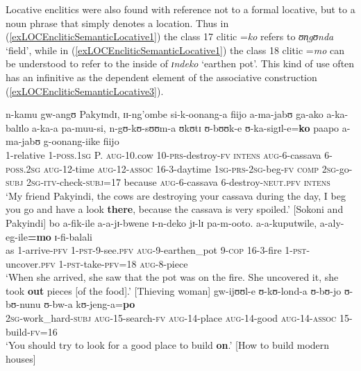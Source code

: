 Locative enclitics were also found with reference not to a formal locative, but to a noun phrase that simply denotes a location. Thus in (\ref{exLOCEncliticSemanticLocative1}) the class 17 clitic =\textit{ko} refers to \textit{ʊn̩gʊnda} \lq field', while in (\ref{exLOCEncliticSemanticLocative1}) the class 18 clitic \mbox{=\textit{mo}} can be understood to refer to the inside of \textit{ɪndeko} `earthen pot'. This kind of use often has an infinitive as the dependent element of the associative construction (\ref{exLOCEncliticSemanticLocative3}).
\begin{exe}
	\ex \label{exLOCEncliticSemanticLocative1} \gll n-kamu gw-angʊ Pakyɪndɪ, ɪɪ-ng’ombe si-k-oonang-a fiijo a-ma-jabʊ ga-ako a-ka-balɪlo a-ka-a pa-muu-si, n-gʊ-kʊ-sʊʊm-a ʊkʊtɪ ʊ-bʊʊk-e ʊ-ka-sigɪl-e=\textbf{ko} paapo a-ma-jabʊ g-oonang-iike fiijo\\
	1-relative 1-\textsc{poss.1sg} P. \textsc{aug}-10.cow 10-\textsc{prs}-destroy-\textsc{fv} \textsc{intens} \textsc{aug}-6-cassava 6-\textsc{poss.2sg} \textsc{aug}-12-time \textsc{aug}-12-\textsc{assoc} 16-3-daytime \textsc{1sg}-\textsc{prs}-\textsc{2sg}-beg-\textsc{fv} \textsc{comp} \textsc{2sg}-go-\textsc{subj} \textsc{2sg}-\textsc{itv}-check-\textsc{subj}=17 because \textsc{aug}-6-cassava 6-destroy-\textsc{neut.pfv} \textsc{intens}\\
	\glt `My friend Pakyindi, the cows are destroying your cassava during the day, I beg you go and have a look \textbf{there}, because the cassava is very spoiled.' [Sokoni and Pakyindi]
	\ex \label{exLOCEncliticSemanticLocative2}
	\gll bo a-fik-ile a-a-jɪ-bwene ɪ-n-deko jɪ-lɪ pa-m-ooto. a-a-kuputwile, a-aly-eg-ile\textbf{=mo} ɪ-fi-balali\\
	as 1-arrive-\textsc{pfv} 1-\textsc{pst}-9-see.\textsc{pfv} \textsc{aug}-9-earthen\_pot 9-\textsc{cop} 16-3-fire 1-\textsc{pst}-uncover.\textsc{pfv} 1-\textsc{pst}-take-\textsc{pfv}=18 \textsc{aug}-8-piece\\
	\glt `When she arrived, she saw that the pot was on the fire. She uncovered it, she took \textbf{out} pieces [of the food].' [Thieving woman]
	\ex \label{exLOCEncliticSemanticLocative3}\gll gw-ijʊʊl-e ʊ-kʊ-lond-a ʊ-bʊ-jo ʊ-bʊ-nunu ʊ-bw-a kʊ-jeng-a=\textbf{po}\\
	\textsc{2sg}-work\_hard-\textsc{subj} \textsc{aug}-15-search-\textsc{fv} \textsc{aug}-14-place \textsc{aug}-14-good \textsc{aug}-14-\textsc{assoc} 15-build-\textsc{fv}=16\\
	\glt `You should try to look for a good place to build \textbf{on}.' [How to build modern houses]
\end{exe}

